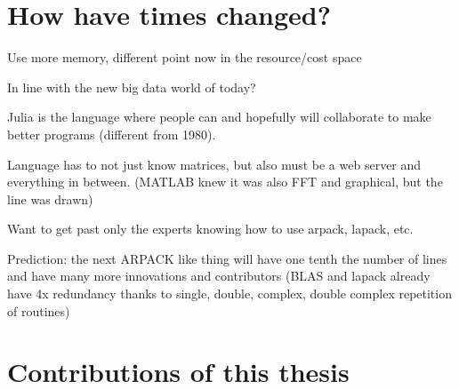 \section{How have times changed?}

Use more memory, different point now in the resource/cost space

In line with the new big data world of today?

Julia is the language where people can and hopefully will collaborate
to make better programs (different from 1980).

Language has to not just know matrices, but also must be a web server
and everything in between. (MATLAB knew it was also FFT and graphical,
but the line was drawn)

Want to get past only the experts knowing how to use arpack, lapack,
etc.

Prediction: the next ARPACK like thing will have one tenth the number
of lines and have many more innovations and contributors (BLAS and
lapack already have 4x redundancy thanks to single, double, complex,
double complex repetition of routines)

\section{Contributions of this thesis}
